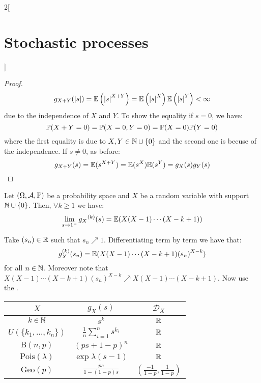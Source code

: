 \documentclass[../../../main_math.tex]{subfiles}
\begin{document}
\begin{multicols}{2}[\section{Stochastic processes}]
\begin{proof}
    $$g_{X+Y}(\abs{s})=\mathbb{E}\left(\abs{s}^{X+Y}\right)=\mathbb{E}\left(\abs{s}^X\right)\mathbb{E}\left(\abs{s}^Y\right)<\infty$$
    due to the independence of $X$ and $Y$.
    To show the equality if $s=0$, we have:
    $$\mathbb{P}(X+Y=0)=\mathbb{P}(X=0,Y=0)=\mathbb{P}(X=0)\mathbb{P}(Y=0)$$
    where the first equality is due to $X,Y\in\mathbb{N}\cup\{0\}$ and the second one is becuse of the independence.
    If $s\ne 0$, as before: $$g_{X+Y}({s})=\mathbb{E}({s}^{X+Y})=\mathbb{E}({s}^X)\mathbb{E}({s}^Y)=g_{X}({s})g_{Y}({s})$$
  \end{proof}
  \begin{theorem}
    Let $(\Omega,\mathcal{A},\mathbb{P})$ be a probability space and $X$ be a random variable with support $\mathbb{N}\cup\{0\}$. Then, $\forall k\geq 1$ we have:
    $$\lim_{s\to 1^-}{g_X}^{(k)}(s)=\mathbb{E}(X(X-1)\cdots(X-k+1))$$
  \end{theorem}
  \begin{sproof}
    Take $(s_n)\in\mathbb{R}$ such that $s_n\nearrow 1$. Differentiating term by term we have that:
    $$
      g_{X}^{(k)}(s_n)=\mathbb{E}(X(X-1)\cdots (X-k+1){(s_n)}^{X-k})
    $$
    for all $n\in\mathbb{N}$. Moreover note that $X(X-1)\cdots (X-k+1){(s_n)}^{X-k}\nearrow X(X-1)\cdots (X-k+1)$. Now use the .
  \end{sproof}
  \begin{center}
    \def\arraystretch{1.3}
    \begin{tabular}{|c|c|c|}
      \hline
      $X$                     & $g_X(s)$                            & $\mathcal{D}_X$                                          \\
      \hline
      $k\in\mathbb{N}$               & $\displaystyle s^{k}$               & $\mathbb{R}$                                                    \\
      $U(\{k_1,\ldots,k_n\})$ & $\frac{1}{n}\sum_{i=1}^n s^{k_i}$   & $\mathbb{R}$                                                    \\
      $\text{B}(n,p)$         & $\displaystyle {(ps+1-p)}^n$        & $\mathbb{R}$                                                    \\
      $\text{Pois}(\lambda)$  & $\displaystyle \exp{\lambda(s-1)}$  & $\mathbb{R}$                                                    \\
      $\text{Geo}(p)$         & $\displaystyle \frac{ps}{1-(1-p)s}$ & $\displaystyle\left(\frac{-1}{1-p},\frac{1}{1-p}\right)$ \\
      \hline
    \end{tabular}
  \end{center}

\end{multicols}
\end{document}
